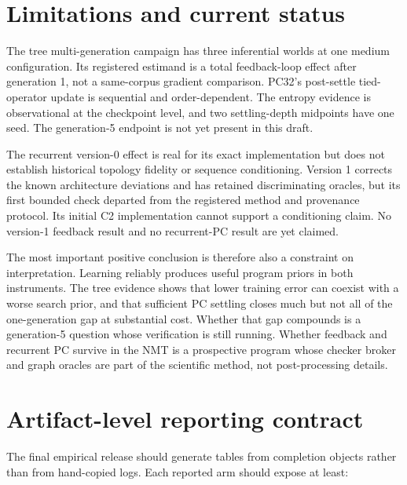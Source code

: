\documentclass[11pt]{article}
\begin{document}
\section{Limitations and current status}

The tree multi-generation campaign has three inferential worlds at one medium configuration.
Its registered estimand is a total feedback-loop effect after generation 1, not a same-corpus
gradient comparison.  PC32's post-settle tied-operator update is sequential and
order-dependent.  The entropy evidence is observational at the checkpoint level, and two
settling-depth midpoints have one seed.  The generation-5 endpoint is not yet present in
this draft.

The recurrent version-0 effect is real for its exact implementation but does not establish
historical topology fidelity or sequence conditioning.  Version 1 corrects the known
architecture deviations and has retained discriminating oracles, but its first bounded
check departed from the registered method and provenance protocol.  Its initial C2
implementation cannot support a conditioning claim.  No version-1 feedback result and no
recurrent-PC result are yet claimed.

The most important positive conclusion is therefore also a constraint on interpretation.
Learning reliably produces useful program priors in both instruments.  The tree evidence
shows that lower training error can coexist with a worse search prior, and that sufficient
PC settling closes much but not all of the one-generation gap at substantial cost.  Whether
that gap compounds is a generation-5 question whose verification is still running.  Whether feedback and recurrent PC
survive in the NMT is a prospective program whose checker broker and graph oracles are part
of the scientific method, not post-processing details.

\appendix
\section{Artifact-level reporting contract}

The final empirical release should generate tables from completion objects rather than
from hand-copied logs.  Each reported arm should expose at least:
\end{document}
